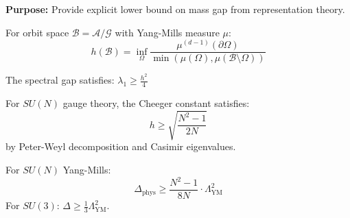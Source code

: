 \textbf{Purpose:} Provide explicit lower bound on mass gap from representation theory.

\begin{definition}
\label{def:cheeger}
For orbit space $\mathcal{B} = \mathcal{A}/\mathcal{G}$ with Yang-Mills measure $\mu$:
\[
h(\mathcal{B}) = \inf_{\Omega} \frac{\mu^{(d-1)}(\partial \Omega)}{\min(\mu(\Omega), \mu(\mathcal{B} \setminus \Omega))}
\]
\end{definition}

\begin{theorem}
\label{thm:cheeger-summary}
The spectral gap satisfies: $\lambda_1 \geq \frac{h^2}{4}$
\end{theorem}

\begin{theorem}
\label{thm:casimir-bound}
For $SU(N)$ gauge theory, the Cheeger constant satisfies:
\[
h \geq \sqrt{\frac{N^2-1}{2N}}
\]
by Peter-Weyl decomposition and Casimir eigenvalues.
\end{theorem}

\begin{corollary}
\label{cor:mass-gap-explicit}
For $SU(N)$ Yang-Mills:
\[
\Delta_{\text{phys}} \geq \frac{N^2-1}{8N} \cdot \Lambda_{\text{YM}}^2
\]
For $SU(3)$: $\Delta \geq \frac{1}{3} \Lambda_{\text{YM}}^2$.
\end{corollary}


